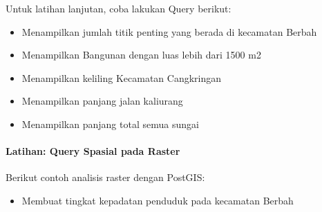 \documentclass[letterpaper,10pt,english]{sphinxmanual}
\begin{document}
Untuk latihan lanjutan, coba lakukan Query berikut:
\begin{itemize}
\item {} 
Menampilkan jumlah titik penting yang berada di kecamatan Berbah

\item {} 
Menampilkan Bangunan dengan luas lebih dari 1500 m2

\item {} 
Menampilkan keliling Kecamatan Cangkringan

\item {} 
Menampilkan panjang jalan kaliurang

\item {} 
Menampilkan panjang total semua sungai

\end{itemize}


\paragraph{Latihan: Query Spasial pada Raster}
\label{\detokenize{sesi2/postgisquery:latihan-query-spasial-pada-raster}}
Berikut contoh analisis raster dengan PostGIS:
\begin{itemize}
\item {} 
Membuat tingkat kepadatan penduduk pada kecamatan Berbah

\end{itemize}

\begin{sphinxVerbatim}[commandchars=\\\{\}]
        
    
  
	      
          
	            
       
  
\end{sphinxVerbatim}
\end{document}
